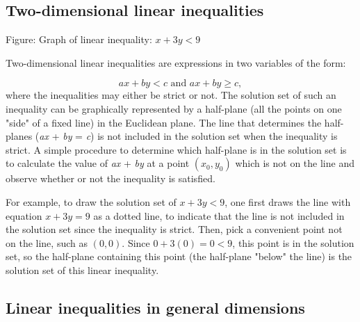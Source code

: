 \subsection{Two-dimensional linear inequalities}
\label{sss:twod-0ac1}







Figure: Graph of linear inequality: $x + 3y < 9$



Two-dimensional linear inequalities are expressions in two variables of the form:



$$ax + by < c \text{ and } ax + by \geq c,$$ where the inequalities may either be strict
or not. The solution set of such an inequality can be graphically represented by a
half-plane (all the points on one "side" of a fixed line) in the Euclidean plane. The line
that determines the half-planes (\textit{ax} + \textit{by} = \textit{c}) is not included
in the solution set when the inequality is strict. A simple procedure to determine which
half-plane is in the solution set is to calculate the value of \textit{ax} + \textit{by}
at a point $(x _0, y _0)$ which is not on the line and observe whether or not the
inequality is satisfied.



For example, to draw the solution set of $x + 3y < 9$, one first draws the line with
equation $x + 3y = 9$ as a dotted line, to indicate that the line is not included in the
solution set since the inequality is strict. Then, pick a convenient point not on the
line, such as $(0,0)$. Since $0 + 3(0) = 0 < 9$, this point is in the solution set, so the
half-plane containing this point (the half-plane "below" the line) is the solution set of
this linear inequality.




\subsection{Linear inequalities in general dimensions}
\label{sss:line-0af1}




